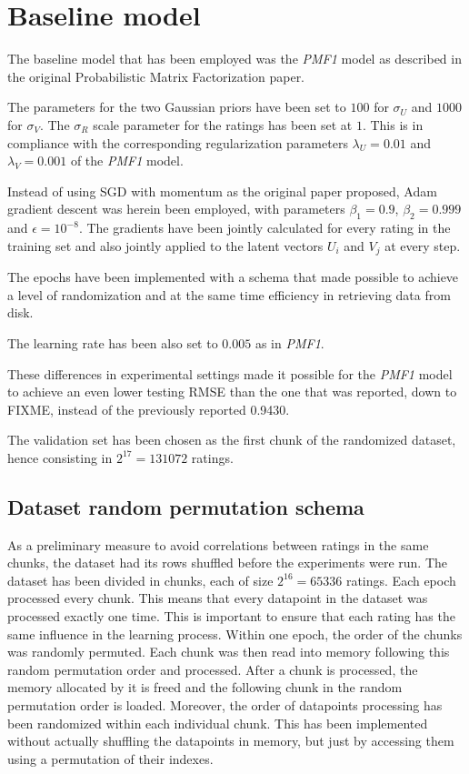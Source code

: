\section{Baseline model}

The baseline model that has been employed was the \emph{PMF1} model as described in the original Probabilistic Matrix Factorization paper.

The parameters for the two Gaussian priors have been set to $100$ for $\sigma_U$ and $1000$ for $\sigma_V$. The $\sigma_R$ scale parameter for the ratings has been set at $1$.
This is in compliance with the corresponding regularization parameters $\lambda_U=0.01$ and $\lambda_V=0.001$ of the \emph{PMF1} model.

Instead of using SGD with momentum as the original paper proposed, Adam gradient descent was herein been employed, with parameters $\beta_1=0.9$, $\beta_2=0.999$ and $\epsilon=10^{-8}$. The gradients have been jointly calculated for every rating in the training set and also jointly applied to the latent vectors $U_i$ and $V_j$ at every step.

The epochs have been implemented with a schema that made possible to achieve a level of randomization and at the same time efficiency in retrieving data from disk.

The learning rate has been also set to $0.005$ as in \emph{PMF1}.

These differences in experimental settings made it possible for the 
\emph{PMF1} model to achieve an even lower testing RMSE than the one that was reported, down to FIXME, instead of the previously reported 0.9430.

The validation set has been chosen as the first chunk of the randomized dataset, hence consisting in $2^17 = 131072$ ratings.

\subsection{Dataset random permutation schema}
As a preliminary measure to avoid correlations between ratings in the same chunks, the 
dataset had its rows shuffled before the experiments were run.
The dataset has been divided in chunks, each of size $2^{16}=65336$ ratings.
Each epoch processed every chunk. This means that every datapoint in the dataset was processed 
exactly one time. This is important to ensure that each rating has the same influence
in the learning process.
Within one epoch, the order of the chunks was randomly permuted. 
Each chunk was then read into memory following this random permutation order and processed. 
After a chunk is processed, the memory allocated by it is freed and the following 
chunk in the random permutation order is loaded. 
Moreover, the order of datapoints processing has been randomized within each individual chunk.
This has been implemented without actually shuffling the datapoints in memory, but just
by accessing them using a permutation of their indexes.

